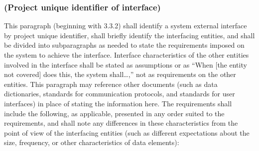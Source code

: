 \documentclass{fidata-report-template}
\begin{document}
\subsubsection{(Project unique identifier of interface)}

This paragraph (beginning with 3.3.2) shall identify a system external
interface by project unique identifier, shall briefly identify the
interfacing entities, and shall be divided into subparagraphs as needed
to state the requirements imposed on the system to achieve the
interface. Interface characteristics of the other entities involved in
the interface shall be stated as assumptions or as ``When {[}the entity
not covered{]} does this, the system shall\ldots{},'' not as
requirements on the other entities. This paragraph may reference other
documents (such as data dictionaries, standards for communication
protocols, and standards for user interfaces) in place of stating the
information here. The requirements shall include the following, as
applicable, presented in any order suited to the requirements, and shall
note any differences in these characteristics from the point of view of
the interfacing entities (such as different expectations about the size,
frequency, or other characteristics of data elements):
\end{document}
